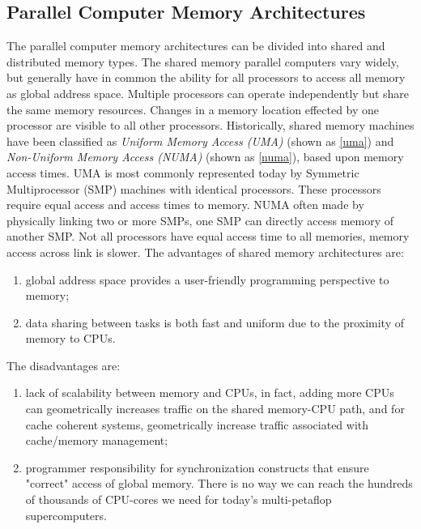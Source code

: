 \subsection{Parallel Computer Memory Architectures}

The parallel computer memory architectures can be divided into shared and distributed memory types. The shared memory parallel computers vary widely, but generally have in common the ability for all processors to access all memory as global address space. Multiple processors can operate independently but share the same memory resources. Changes in a memory location effected by one processor are visible to all other processors. Historically, shared memory machines have been classified as \textit{Uniform Memory Access (UMA)} (shown as \ref{uma}) and \textit{Non-Uniform Memory Access (NUMA)} (shown as \ref{numa}), based upon memory access times. UMA is most commonly represented today by Symmetric Multiprocessor (SMP) machines with identical processors. These processors require equal access and access times to memory. NUMA often made by physically linking two or more SMPs, one SMP can directly access memory of another SMP. Not all processors have equal access time to all memories, memory access across link is slower. The advantages of shared memory architectures are: 
\begin{enumerate}
	\item  global address space provides a user-friendly programming perspective to memory; 
	\item  data sharing between tasks is both fast and uniform due to the proximity of memory to CPUs.
\end{enumerate}

The disadvantages are:
\begin{enumerate}
	\item lack of scalability between memory and CPUs, in fact, adding more CPUs can geometrically increases traffic on the shared memory-CPU path, and for cache coherent systems, geometrically increase traffic associated with cache/memory management; 
	\item programmer responsibility for synchronization constructs that ensure "correct" access of global memory. There is no way we can reach the hundreds of thousands of CPU-cores we need for today’s multi-petaflop supercomputers.
\end{enumerate}

